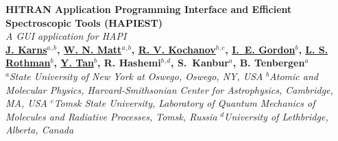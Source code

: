 \documentclass[a0,landscape]{a0poster}
\begin{document}
\begin{minipage}[b]{0.78\linewidth}
\VeryHuge \color{NavyBlue} \textbf{HITRAN Application Programming Interface and Efficient Spectroscopic Tools (HAPIEST)}\\[0.1cm]%
\color{Black}\LARGE\textit{A GUI application for HAPI}\\[1.5cm] %
\LARGE\textbf{\underline{J. Karns}$^a$$^,$$^b$, \underline{W. N. Matt}$^a$$^,$$^b$, \underline{R. V. Kochanov}$^b$$^,$$^c$, \underline{I.~E. Gordon}$^b$, \underline{L. S. Rothman}$^b$, \underline{Y. Tan}$^b$, R. Hashemi$^b$$^,$$^d$, S.~Kanbur$^a$, B. Tenbergen$^a$}\\[0.5cm] %
\large $^a$\textit{State University of New York at Oswego, Oswego, NY, USA}
\large $^b$\textit{Atomic and Molecular Physics, Harvard-Smithsonian Center for Astrophysics, Cambridge, MA, USA}
\large $^c$\textit{Tomsk State University, Laboratory of Quantum Mechanics of Molecules and Radiative Processes, Tomsk, Russia}
\large $^d$\textit{University of Lethbridge, Alberta, Canada}
\end{minipage}
%
\end{document}
